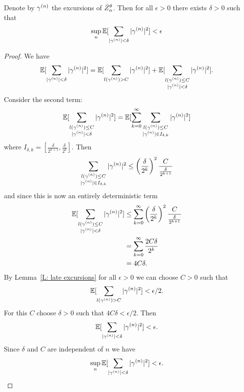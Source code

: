 \begin{lemma} \label{L: sum rgamman}
	Denote by $\gamma^{(n)}$ the excursions of $\bar{Z}^{\theta}_n$. 
	Then for all $\epsilon > 0$ there exists $\delta > 0$ such that
	\begin{equation}
		\sup_n \mathbb{E}[\sum_{|\gamma^{(n)}| < \delta} |\gamma^{(n)}|^2] < \epsilon
	\end{equation}
\end{lemma}
\begin{proof}
	We have
	\begin{equation}
		\mathbb{E}[\sum_{|\gamma^{(n)}| < \delta} |\gamma^{(n)}|^2] 
		= \mathbb{E}[\sum_{l(\gamma^{(n)}) > C} |\gamma^{(n)}|^2] 
		+ \mathbb{E}[\sum_{\substack{l(\gamma^{(n)}) \leq C \\ |\gamma^{(n)}| < \delta}} |\gamma^{(n)}|^2].
	\end{equation}
	Consider the second term:
	\begin{equation}
		\mathbb{E}[\sum_{\substack{l(\gamma^{(n)}) \leq C \\ |\gamma^{(n)}| < \delta}} |\gamma^{(n)}|^2]
		= \mathbb{E}[\sum_{k = 0}^{\infty} \sum_{\substack{l(\gamma^{(n)}) \leq C \\ |\gamma^{(n)}| \in I_{\delta, k}}} |\gamma^{(n)}|^2]
	\end{equation}
	where $I_{\delta, k} = [ \frac{\delta}{2^{k+1}}, \frac{\delta}{2^{k}} ]$.
	Then
	\begin{equation}
		\sum_{\substack{l(\gamma^{(n)}) \leq C \\ |\gamma^{(n)}| \in I_{\delta, k}}} |\gamma^{(n)}|^2 
		\leq \left(\frac{\delta}{2^k}\right)^2 \frac{C}{\frac{\delta}{2^{k+1}}}
	\end{equation}
	and since this is now an entirely deterministic term
	\begin{equation}
	\begin{aligned}
	\mathbb{E}[\sum_{\substack{l(\gamma^{(n)}) \leq C \\ |\gamma^{(n)}| < \delta}} |\gamma^{(n)}|^2] 
	&\leq \sum_{k = 0}^{\infty} \left(\frac{\delta}{2^k}\right)^2 \frac{C}{\frac{\delta}{2^{k+1}}} \\
	&= \sum_{k = 0}^{\infty} \frac{2C\delta}{2^k} \\
	&= 4C\delta.
	\end{aligned}
	\end{equation}
	By Lemma~\ref{L: late excursions} for all $\epsilon > 0$ we can choose $C > 0$ such that 
	\begin{equation}
		\mathbb{E}[ \sum_{l(\gamma^{(n)}) > C} |\gamma^{(n)}|^2 ] < \epsilon / 2.
	\end{equation}
	For this $C$ choose $\delta > 0$ such that $4C\delta < \epsilon/2$.
	Then
	\begin{equation}
		\mathbb{E}[\sum_{|\gamma^{(n)}| < \delta} |\gamma^{(n)}|^2]  < \epsilon.
	\end{equation}
	Since $\delta$ and $C$ are independent of $n$ we have
	\begin{equation}
	\sup_n \mathbb{E}[\sum_{|\gamma^{(n)}| < \delta} |\gamma^{(n)}|^2] < \epsilon.
	\end{equation}
\end{proof}


